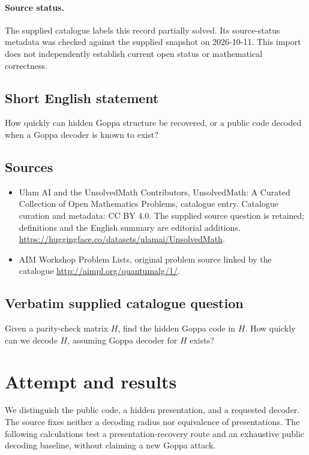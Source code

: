 \documentclass[11pt]{article}
\begin{document}
\paragraph{Source status.}
The supplied catalogue labels this record partially solved. Its source-status metadata was checked against the supplied snapshot on 2026-10-11. This import does not independently establish current open status or mathematical correctness.
\subsection{Short English statement}
How quickly can hidden Goppa structure be recovered, or a public code decoded when a Goppa decoder is known to exist?
\subsection{Sources}
\begin{itemize}
\item[S1] Ulam AI and the UnsolvedMath Contributors, UnsolvedMath: A Curated Collection of Open Mathematics Problems, catalogue entry. Catalogue curation and metadata: CC BY 4.0. The supplied source question is retained; definitions and the English summary are editorial additions.
\url{https://huggingface.co/datasets/ulamai/UnsolvedMath}.
\item[S2] AIM Workshop Problem Lists, original problem source linked by the catalogue
\url{http://aimpl.org/quantumalg/1/}.
\end{itemize}
\subsection{Verbatim supplied catalogue question}
Given a parity-check matrix $H$, find the hidden Goppa code in $H$. How quickly can we decode $H$, assuming Goppa decoder for $H$ exists?

\section{Attempt and results}
We distinguish the public code, a hidden presentation, and a requested decoder.
The source fixes neither a decoding radius nor equivalence of presentations.
The following calculations test a presentation-recovery route and an exhaustive
public decoding baseline, without claiming a new Goppa attack.
\end{document}
